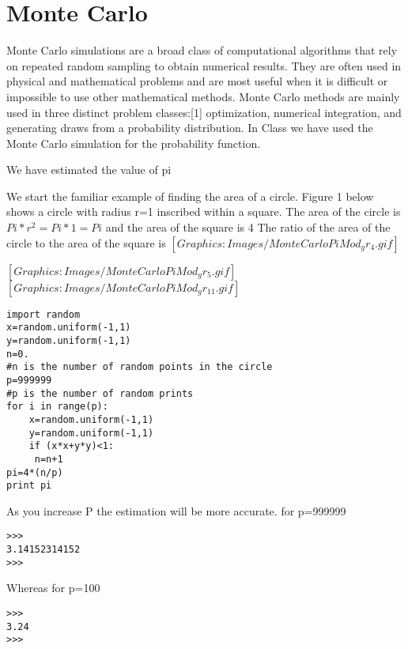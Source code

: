 \chapter{Monte Carlo}
Monte Carlo simulations are a broad class of computational algorithms that rely on repeated random sampling to obtain numerical results. They are often used in physical and mathematical problems and are most useful when it is difficult or impossible to use other mathematical methods. Monte Carlo methods are mainly used in three distinct problem classes:[1] optimization, numerical integration, and generating draws from a probability distribution. In Class we have used the Monte Carlo simulation for the probability function.

We have estimated the value of pi 

    We start the familiar example of finding the area of a circle.  Figure 1 below shows a circle with radius r=1 inscribed within a square. The area of the circle is $Pi*r^2=Pi*1=Pi$ and the area of the square is 4 The ratio of the area of the circle to the area of the square is
    $[Graphics:Images/MonteCarloPiMod_gr_4.gif] $
    
        $[Graphics:Images/MonteCarloPiMod_gr_5.gif] $
        $[Graphics:Images/MonteCarloPiMod_gr_11.gif] $
\begin{verbatim} 
import random 
x=random.uniform(-1,1)
y=random.uniform(-1,1)
n=0.
#n is the number of random points in the circle
p=999999
#p is the number of random prints
for i in range(p):
    x=random.uniform(-1,1)
    y=random.uniform(-1,1)
    if (x*x+y*y)<1:
     n=n+1
pi=4*(n/p)
print pi
\end{verbatim}

As you increase P the estimation will be more accurate. for p=999999
\begin{verbatim}
>>> 
3.14152314152
>>> 
\end{verbatim}
Whereas for p=100
\begin{verbatim}
>>> 
3.24
>>> 
\end{verbatim}

